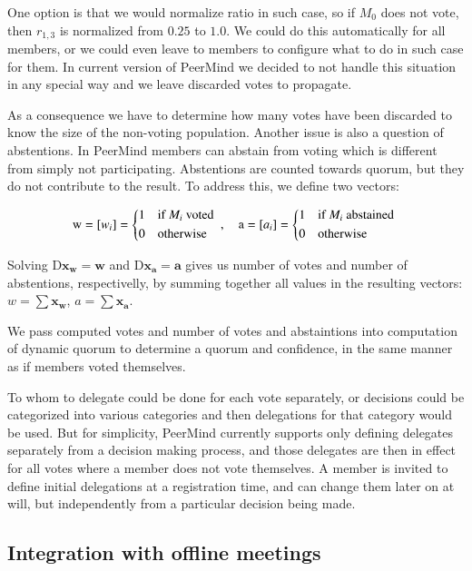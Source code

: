 \documentclass{sigchi}
\begin{document}
One option is that we would normalize ratio in such case, so if $M_0$ does not vote, then $r_{1,3}$ is normalized
from $0.25$ to $1.0$.
We could do this automatically for all members, or we could even leave to members to configure
what to do in such case for them.
In current version of PeerMind we decided to not handle this situation in any special way and we leave
discarded votes to propagate.

As a consequence we have to determine how many votes have been discarded to know the size of the non-voting
population.
Another issue is also a question of abstentions.
In PeerMind members can abstain from voting which is different from simply not participating.
Abstentions are counted towards quorum, but they do not contribute to the result.
To address this, we define two vectors:

\begin{displaymath}
\mathrm{w} = \left[w_{i}\right] = \begin{dcases*}
 1 & if $M_i$ voted \\
 0 & otherwise \\
\end{dcases*},\quad \mathrm{a} = \left[a_{i}\right] = \begin{dcases*}
 1 & if $M_i$ abstained \\
 0 & otherwise \\
\end{dcases*}
\end{displaymath}

Solving $\mathrm{D} \mathbf{x_w} = \mathbf{w}$ and $\mathrm{D} \mathbf{x_a} = \mathbf{a}$ gives
us number of votes and number of abstentions, respectivelly, by summing together all values in the
resulting vectors: $w = \sum \mathbf{x_w}$, $a = \sum \mathbf{x_a}$.


We pass computed votes and number of votes and abstaintions into computation of dynamic quorum to determine
a quorum and confidence, in the same manner as if members voted themselves.

To whom to delegate could be done for each vote separately, or decisions could be categorized into various
categories and then delegations for that category would be used.
But for simplicity, PeerMind currently supports only defining delegates separately from a decision making process,
and those delegates are then in effect for all votes where a member does not vote themselves.
A member is invited to define initial delegations at a registration time, and can change them later on at will,
but independently from a particular decision being made.

\subsection{Integration with offline meetings}



\end{document}
